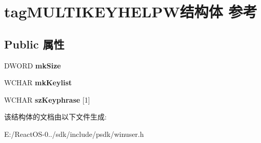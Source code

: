\hypertarget{structtag_m_u_l_t_i_k_e_y_h_e_l_p_w}{}\section{tag\+M\+U\+L\+T\+I\+K\+E\+Y\+H\+E\+L\+P\+W结构体 参考}
\label{structtag_m_u_l_t_i_k_e_y_h_e_l_p_w}
\subsection*{Public 属性}
\begin{DoxyCompactItemize}
\item 
\mbox{\label{structtag_m_u_l_t_i_k_e_y_h_e_l_p_w_ad705c4015d6c3fe8b9248d97c57282c5}} 
D\+W\+O\+RD {\bfseries mk\+Size}
\item 
\mbox{\label{structtag_m_u_l_t_i_k_e_y_h_e_l_p_w_ad946a4bfd7e3c204ef2904f3bcf86972}} 
W\+C\+H\+AR {\bfseries mk\+Keylist}
\item 
\mbox{\label{structtag_m_u_l_t_i_k_e_y_h_e_l_p_w_aa2cb21be9d3a25e96fe55cbcb5d84561}} 
W\+C\+H\+AR {\bfseries sz\+Keyphrase} \mbox{[}1\mbox{]}
\end{DoxyCompactItemize}


该结构体的文档由以下文件生成\+:\begin{DoxyCompactItemize}
\item 
E\+:/\+React\+O\+S-\/0../sdk/include/psdk/winuser.\+h\end{DoxyCompactItemize}
